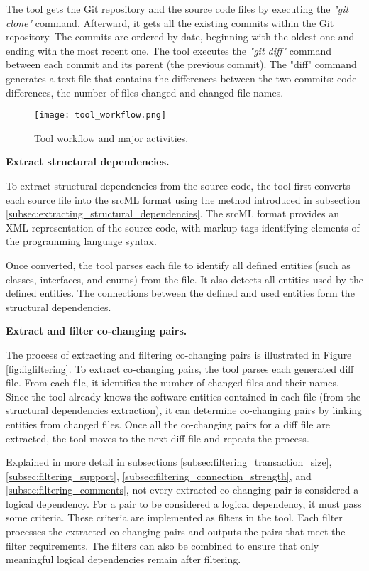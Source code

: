 The tool gets the Git repository and the source code files by executing the \textit{"git clone"} command. Afterward, it gets all the existing commits within the Git repository. The commits are ordered by date, beginning with the oldest one and ending with the most recent one. The tool executes the \textit{"git diff"} command between each commit and its parent (the previous commit). The "diff" command generates a text file that contains the differences between the two commits: code differences, the number of files changed and changed file names.


\begin{figure}[H]
\centering
\texttt{[image: tool\_workflow.png]}
\caption{Tool workflow and major activities.}
\label{fig:figworkflow}
\end{figure}



\textbf{Extract structural dependencies.}

To extract structural dependencies from the source code, the tool first converts each source file into the srcML format using the method introduced in subsection \ref{subsec:extracting_structural_dependencies}. The srcML format provides an XML representation of the source code, with markup tags identifying elements of the programming language syntax\cite{srcML}. 

Once converted, the tool parses each file to identify all defined entities (such as classes, interfaces, and enums) from the file. It also detects all entities used by the defined entities. The connections between the defined and used entities form the structural dependencies.


\textbf{Extract and filter co-changing pairs.}

The process of extracting and filtering co-changing pairs is illustrated in Figure \ref{fig:figfiltering}. To extract co-changing pairs, the tool parses each generated diff file. From each file, it identifies the number of changed files and their names. Since the tool already knows the software entities contained in each file (from the structural dependencies extraction), it can determine co-changing pairs by linking entities from changed files. Once all the co-changing pairs for a diff file are extracted, the tool moves to the next diff file and repeats the process.

Explained in more detail in subsections \ref{subsec:filtering_transaction_size}, \ref{subsec:filtering_support}, \ref{subsec:filtering_connection_strength}, and \ref{subsec:filtering_comments}, not every extracted co-changing pair is considered a logical dependency. For a pair to be considered a logical dependency, it must pass some criteria. These criteria are implemented as filters in the tool. Each filter processes the extracted co-changing pairs and outputs the pairs that meet the filter requirements. The filters can also be combined to ensure that only meaningful logical dependencies remain after filtering.

